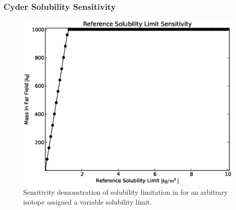 
\begin{frame}[ctb!]
\frametitle{Cyder Solubility Sensitivity}
\begin{figure}[htbp!]
\begin{center}
\includegraphics[width=0.7\linewidth]{./nuclide_demonstration/sol.eps}
\end{center}
\caption{Sensitivity demonstration of solubility limitation in \Cyder for an 
arbitrary isotope assigned a variable solubility limit. }
\label{fig:sol_result}
\end{figure}

\end{frame}
